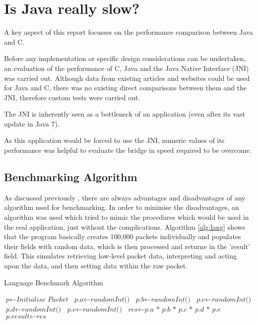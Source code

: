 \documentclass[final_report.tex]{subfiles}
\begin{document}
\section{Is Java really slow?}
A key aspect of this report focusses on the performance comparison between Java and C.

Before any implementation or specific design considerations can be undertaken, an evaluation of the performance of C, Java and the Java Native Interface (JNI) was carried out. Although data from existing articles and websites could be used for Java and C, there was no existing direct comparisons between them and the JNI, therefore custom tests were carried out.

The JNI is inherently  seen as a bottleneck of an application (even after its vast update in Java 7). 

As this application would be forced to use the JNI, numeric values of its performance was helpful to evaluate the bridge in speed required to be overcome.

\subsection{Benchmarking Algorithm}
As discussed previously , there are always advantages and disadvantages of any algorithm used for benchmarking. In order to minimise the disadvantages, an algorithm was used which tried to mimic the procedures which would be used in the real application, just without the complications. Algorithm \ref{alg:lang} shows that the program basically creates 100,000 packets individually and populates their fields with random data, which is then processed and returne in the 'result' field. This simulates retrieving low-level packet data, interpreting and acting upon the data, and then setting data within the raw packet.

\begin{algorithm}[H]
	\caption{Language Benchmark Algorithm}
	\label{alg:lang}
	\begin{algorithmic}[1]
				\State $\textit{p} \gets \textit{Initialise Packet}$
				\State {}
				\State {}
			\EndFor
		\EndFunction
		\newline
		 
			\State $\textit{p.a} \gets \textit{randomInt()}$
			\State $\textit{p.b} \gets \textit{randomInt()}$
			\State $\textit{p.c} \gets \textit{randomInt()}$
			\State $\textit{p.d} \gets \textit{randomInt()}$
			\State $\textit{p.e} \gets \textit{randomInt()}$
		\EndFunction
		\newline
		 
			\State $\textit{res} \gets \textit{p.a * p.b * p.c * p.d * p.e}$
			\State $\textit{p.result} \gets \textit{res}$
		\EndFunction
	\end{algorithmic}
\end{algorithm}
\end{document}
